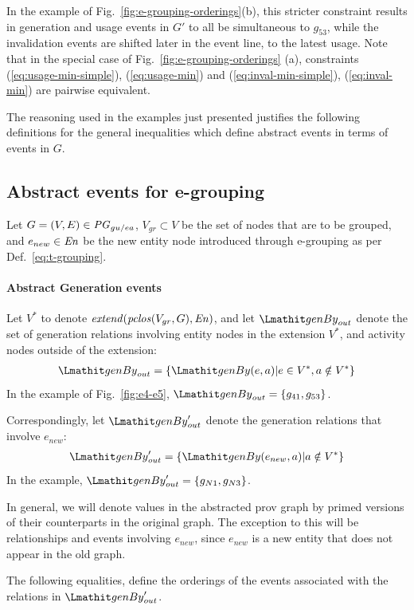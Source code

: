 In the example of Fig.~\ref{fig:e-grouping-orderings}(b), this stricter constraint results in  generation and usage events in $G'$ to all be simultaneous to $g_{53}$, while the invalidation events are shifted later in the event line, to the latest usage. Note that in the special case of Fig.~\ref{fig:e-grouping-orderings} (a), constraints (\ref{eq:usage-min-simple}), (\ref{eq:usage-min}) and (\ref{eq:inval-min-simple}), (\ref{eq:inval-min})  are pairwise equivalent.

The reasoning used in the examples just presented justifies the following definitions for the general inequalities which define abstract events in terms of events in $G$.

\subsection{Abstract events for e-grouping}
\label{sec:abstract-events-for-e-grouping}
%
Let $G=(V,E) \in \mathit{PG}_{gu/ea}$, $V_{gr} \subset V$ be the set of nodes that are to be grouped, and  $e_{new} \in \mathit{En}$ be the new entity node introduced through e-grouping as per Def.~\ref{eq:t-grouping}.
% 

\paragraph*{\textbf{Abstract Generation events}}
Let $V^*$ to denote $\mathit{extend}(\mathit{pclos}(V_{gr},G), \mathit{En})$, and let $\wgby_{out}$ denote the set of generation relations involving entity nodes in the extension
$V^*$, and activity nodes outside of the extension:
\begin{align*} 
\wgby_{out} = \{ \wgby(e,a) |  e \in V^*,  a \notin V^* \}
\end{align*} 
In the example of Fig.~\ref{fig:e4-e5}, $\wgby_{out} = \{ g_{41}, g_{53} \}$.

%
Correspondingly, let $\wgby'_{out}$ denote the generation relations that involve $e_{new}$:
\begin{align*} 
\wgby'_{out} = \{ \wgby(e_{new},a) | a \notin V^* \}
\end{align*} 
In the example, $\wgby'_{out} = \{ g_{N1}, g_{N3} \}$.

In general, we will denote values in the abstracted prov graph by primed versions of their counterparts in the original graph. The exception to this will be relationships and events involving $e_{new}$, since $e_{new}$ is  a new entity that does not appear in the old graph.

The following equalities, define the orderings of the events associated with the relations in $\wgby'_{out}$.

